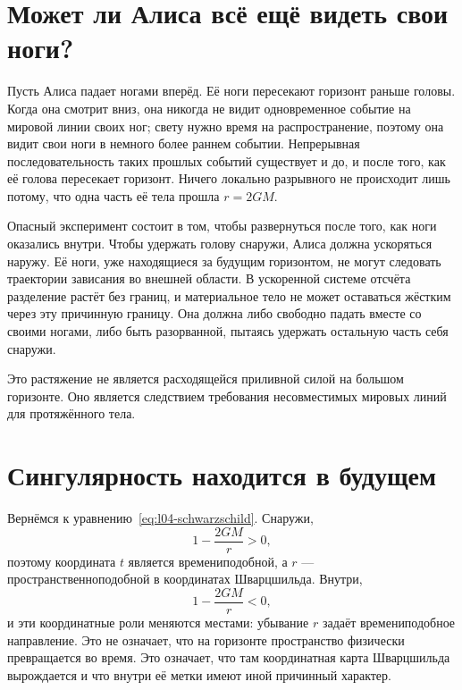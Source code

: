 \section{Может ли Алиса всё ещё видеть свои ноги?}

Пусть Алиса падает ногами вперёд. Её ноги пересекают горизонт раньше головы. Когда она смотрит вниз, она никогда не видит одновременное событие на мировой линии своих ног; свету нужно время на распространение, поэтому она видит свои ноги в немного более раннем событии. Непрерывная последовательность таких прошлых событий существует и до, и после того, как её голова пересекает горизонт. Ничего локально разрывного не происходит лишь потому, что одна часть её тела прошла \(r=2GM\).

Опасный эксперимент состоит в том, чтобы развернуться после того, как ноги оказались внутри. Чтобы удержать голову снаружи, Алиса должна ускоряться наружу. Её ноги, уже находящиеся за будущим горизонтом, не могут следовать траектории зависания во внешней области. В ускоренной системе отсчёта разделение растёт без границ, и материальное тело не может оставаться жёстким через эту причинную границу. Она должна либо свободно падать вместе со своими ногами, либо быть разорванной, пытаясь удержать остальную часть себя снаружи.

Это растяжение не является расходящейся приливной силой на большом горизонте. Оно является следствием требования несовместимых мировых линий для протяжённого тела.

\section{Сингулярность находится в будущем}

Вернёмся к уравнению~\eqref{eq:l04-schwarzschild}. Снаружи,
\begin{equation}
1-\frac{2GM}{r}>0,
\end{equation}
поэтому координата \(t\) является времениподобной, а \(r\) — пространственноподобной в координатах Шварцшильда. Внутри,
\begin{equation}
1-\frac{2GM}{r}<0,
\end{equation}
и эти координатные роли меняются местами: убывание \(r\) задаёт времениподобное направление. Это не означает, что на горизонте пространство физически превращается во время. Это означает, что там координатная карта Шварцшильда вырождается и что внутри её метки имеют иной причинный характер.

